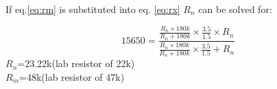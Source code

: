 If eq.\ref{eq:rm} is substituted into eq. \ref{eq:rx} $R_n$ can be solved for: 

\begin{equation}
	15650=\frac{\frac{R_n\times 180k}{R_{n}+180k}\times \frac{3.5}{1.5}\times R_n}{\frac{R_n\times 180k}{R_{n}+180k}\times \frac{3.5}{1.5}+R_n}
\end{equation}
$R_n$=23.22k\textohm (lab resistor of 22k\textohm) \\
$R_m$=48k\textohm (lab resistor of 47k\textohm)

